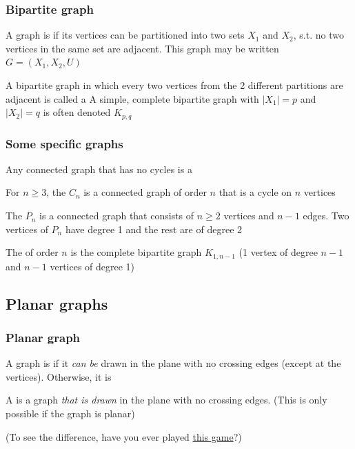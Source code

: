 \documentclass[aspectratio=43]{beamer}
\begin{document}
\begin{frame}\frametitle{Bipartite graph}
	\begin{definition}
		A graph is  if its vertices can be partitioned into two sets $X_1$ and $X_2$, s.t. no two vertices in the same set are adjacent.
		This graph may be written $G=(X_1,X_2,U)$
	\end{definition}
	\vfill
	\begin{definition}
		A bipartite graph in which every two vertices from the 2 different partitions are adjacent is called a 
		\vskip0.25cm
		A simple, complete bipartite graph with $|X_1|=p$ and $|X_2|=q$ is often denoted $K_{p,q}$
	\end{definition}
\end{frame}

\begin{frame}\frametitle{Some specific graphs}
	\begin{definition}[{Tree}]
		Any connected graph that has no cycles is a 
	\end{definition}
	\begin{definition}[{Cycle $C_n$}]
		For $n\geq 3$, the  $C_n$ is a connected graph of order $n$ that is a cycle on $n$ vertices
	\end{definition}
	\begin{definition}[{Path $P_n$}]
		The  $P_n$ is a connected graph that consists of $n\geq 2$ vertices and $n-1$ edges. Two vertices of $P_n$ have degree 1 and the rest are of degree 2
	\end{definition}
	\begin{definition}[{Star $S_n$}]
		The  of order $n$ is the complete bipartite graph $K_{1,n-1}$ (1 vertex of degree $n-1$ and $n-1$ vertices of degree 1)
	\end{definition}
\end{frame}






\subsection{Planar graphs}
\begin{frame}\frametitle{Planar graph}
\begin{definition}
A graph is  if it \emph{can be} drawn in the plane with no crossing edges (except at the vertices). Otherwise, it is 
\end{definition}
\vfill
\begin{definition}
A  is a graph \emph{that is drawn} in the plane with no crossing edges. (This is only possible if the graph is planar)
\end{definition}
\vfill
(To see the difference, have you ever played \href{https://www.chiark.greenend.org.uk/~sgtatham/puzzles/js/untangle.html}{this game}?)
\end{frame}
\end{document}
